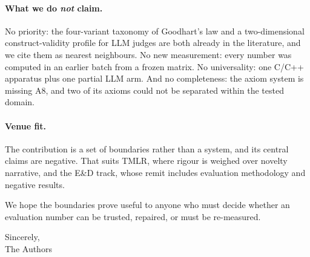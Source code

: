 \documentclass[11pt]{article}
\begin{document}
\paragraph{What we do \emph{not} claim.}
No priority: the four-variant taxonomy of Goodhart's law and a two-dimensional construct-validity
profile for LLM judges are both already in the literature, and we cite them as nearest neighbours.
No new measurement: every number was computed in an earlier batch from a frozen matrix. No
universality: one C/C++ apparatus plus one partial LLM arm. And no completeness: the axiom system is
missing A8, and two of its axioms could not be separated within the tested domain.

\paragraph{Venue fit.}
The contribution is a set of boundaries rather than a system, and its central claims are negative.
That suits TMLR, where rigour is weighed over novelty narrative, and the E\&D track, whose remit
includes evaluation methodology and negative results.

\medskip
\noindent
We hope the boundaries prove useful to anyone who must decide whether an evaluation number can be
trusted, repaired, or must be re-measured.

\bigskip
\noindent
Sincerely,\\
The Authors
\end{document}
